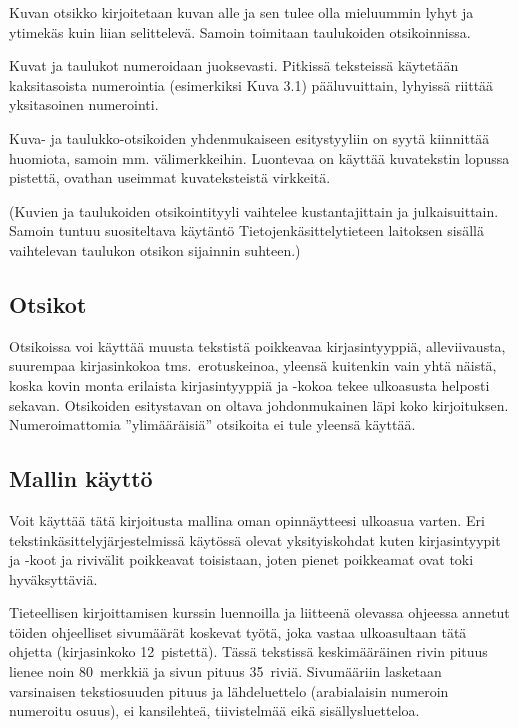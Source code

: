 \documentclass[finnish,gradu]{tktltiki}
\begin{document}
Kuvan otsikko kirjoitetaan kuvan alle ja sen tulee olla mieluummin lyhyt
ja ytimekäs kuin liian selittelevä.
Samoin toimitaan taulukoiden otsikoinnissa.

Kuvat ja taulukot numeroidaan juoksevasti. Pitkissä teksteissä käytetään
kaksitasoista numerointia (esimerkiksi Kuva 3.1) pääluvuittain, lyhyissä
riittää yksitasoinen numerointi.


Kuva- ja taulukko-otsikoiden yhdenmukaiseen esitystyyliin on syytä kiinnittää
huomiota, samoin mm. välimerkkeihin. Luontevaa on käyttää
kuvatekstin lopussa pistettä, ovathan useimmat kuvateksteistä virkkeitä. 

(Kuvien ja taulukoiden otsikointityyli vaihtelee
kustantajittain ja julkaisuittain. Samoin tuntuu suositeltava käytäntö
Tietojenkäsittelytieteen laitoksen sisällä vaihtelevan taulukon
otsikon sijainnin suhteen.)


\subsection{Otsikot}

Otsikoissa voi käyttää muusta tekstistä poikkeavaa kirjasintyyppiä,
alleviivausta, suurempaa kirjasinkokoa tms.\ erotuskeinoa, yleensä
kuitenkin vain yhtä näistä, koska kovin monta erilaista kirjasintyyppiä
ja -kokoa tekee ulkoasusta helposti sekavan.  Otsikoiden esitystavan on
oltava johdonmukainen läpi koko kirjoituksen. Numeroimattomia
''ylimääräisiä'' otsikoita ei tule yleensä käyttää.


\subsection{Mallin käyttö}

Voit käyttää tätä kirjoitusta mallina oman opinnäytteesi ulkoasua
varten. Eri tekstinkäsittelyjärjestelmissä käytössä olevat yksityiskohdat kuten
kirjasintyypit ja -koot ja rivivälit  poikkeavat toisistaan, joten
pienet poikkeamat ovat toki hyväksyttäviä.

Tieteellisen kirjoittamisen kurssin luennoilla ja
liitteenä olevassa ohjeessa annetut töiden ohjeelliset sivumäärät
koskevat työtä, joka vastaa ulkoasultaan tätä ohjetta (kirjasinkoko
12~pistettä). Tässä tekstissä keskimääräinen rivin pituus lienee noin
80~merkkiä ja sivun pituus 35~riviä.
Sivumääriin lasketaan varsinaisen tekstiosuuden pituus ja lähdeluettelo
(arabialaisin numeroin numeroitu osuus), ei kansilehteä, tiivistelmää
eikä sisällysluetteloa.
\end{document}
